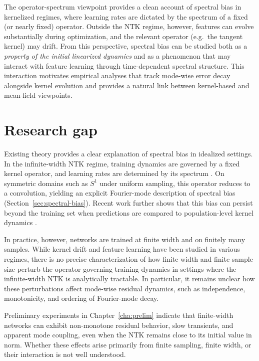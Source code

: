 The operator-spectrum viewpoint provides a clean account of spectral bias in
kernelized regimes, where learning rates are dictated by the spectrum of a fixed
(or nearly fixed) operator. Outside the NTK regime, however, features can evolve
substantially during optimization, and the relevant operator (e.g.\ the tangent
kernel) may drift. From this perspective, spectral bias can be studied both as a
\emph{property of the initial linearized dynamics} and as a phenomenon that may
interact with feature learning through time-dependent spectral structure. This
interaction motivates empirical analyses that track mode-wise error decay
alongside kernel evolution and provides a natural link between kernel-based and
mean-field viewpoints.

\section{Research gap}\label{sec:research-gap}

Existing theory provides a clear explanation of spectral bias in idealized
settings. In the infinite-width NTK regime, training dynamics are governed by a
fixed kernel operator, and learning rates are determined by its spectrum
\citep{cao2020understandingspectralbiasdeep}. On symmetric domains such as $S^1$
under uniform sampling, this operator reduces to a convolution, yielding an
explicit Fourier-mode description of spectral bias
(Section~\ref{sec:spectral-bias}). Recent work further shows that this bias can
persist beyond the training set when predictions are compared to population-level
kernel dynamics \citep{bowman2022spectralbiasoutsidetraining}.

In practice, however, networks are trained at finite width and on finitely many
samples. While kernel drift and feature learning have been studied in various
regimes, there is no precise characterization of how finite width and finite
sample size perturb the operator governing training dynamics in settings where
the infinite-width NTK is analytically tractable. In particular, it remains
unclear how these perturbations affect mode-wise residual dynamics, such as
independence, monotonicity, and ordering of Fourier-mode decay.

Preliminary experiments in Chapter~\ref{cha:prelim} indicate that finite-width
networks can exhibit non-monotone residual behavior, slow transients, and
apparent mode coupling, even when the NTK remains close to its initial value in
norm. Whether these effects arise primarily from finite sampling, finite width,
or their interaction is not well understood.


